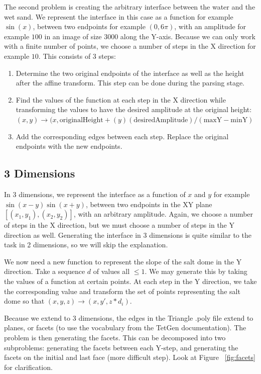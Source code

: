The second problem is creating the arbitrary interface between the water and the wet sand. We represent the interface in this case as a function for example $\sin(x)$, between two endpoints for example $(0, 6\pi)$, with an amplitude for example $100$ in an image of size $3000$ along the Y-axis. Because we can only work with a finite number of points, we choose a number of steps in the X direction for example $10$. This consists of 3 steps:

\begin{enumerate}
\item Determine the two original endpoints of the interface as well as the height after the affine transform. This step can be done during the parsing stage.
\item Find the values of the function at each step in the X direction while transforming the values to have the desired amplitude at the original height: $(x,y) \rightarrow (x, \text{originalHeight} + (y)( \text{desiredAmplitude}) / (\text{maxY} - \text{minY})$
\item Add the corresponding edges between each step. Replace the original endpoints with the new endpoints.
\end{enumerate}

\subsection{3 Dimensions}




In 3 dimensions, we represent the interface as a function of $x$ and $y$ for example $\sin(x-y) \sin(x+y)$, between two endpoints in the XY plane $[(x_1,y_1),(x_2,y_2)]$, with an arbitrary amplitude. Again, we choose a number of steps in the X direction, but we must choose a number of steps in the Y direction as well. Generating the interface in 3 dimensions is quite similar to the task in 2 dimensions, so we will skip the explanation.

We now need a new function to represent the slope of the salt dome in the Y direction. Take a sequence $d$ of values all $\leq 1$. We may generate this by taking the values of a function at certain points. At each step in the Y direction, we take the corresponding value and transform the set of points representing the salt dome so that $(x,y,z) \rightarrow (x,y',z * d_i)$.

Because we extend to 3 dimensions, the edges in the Triangle .poly file extend to planes, or facets (to use the vocabulary from the TetGen documentation). The problem is then generating the facets. This can be decomposed into two subproblems: generating the facets between each Y-step, and generating the facets on the initial and last face (more difficult step). Look at Figure ~\ref{fig:facets} for clarification.

